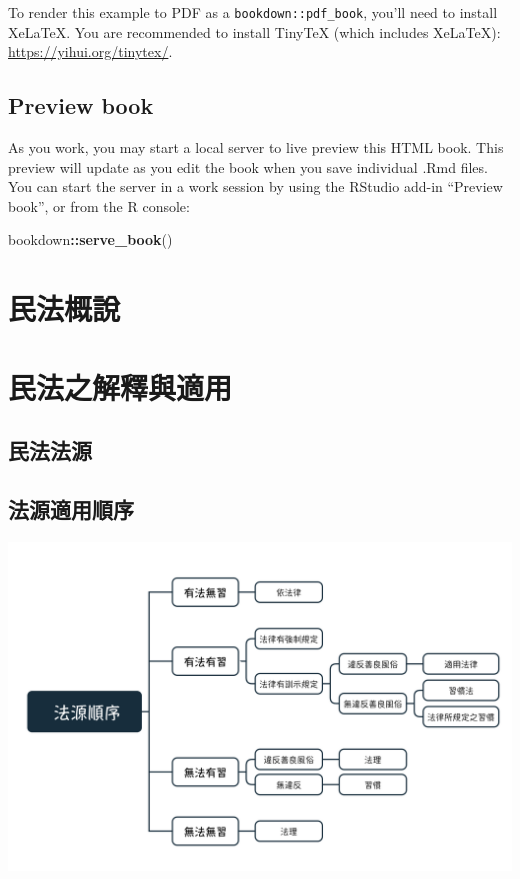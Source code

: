 \documentclass[
]{book}
\newenvironment{Shaded}{\begin{snugshade}}{\end{snugshade}}
\newcommand{\FunctionTok}[1]{\textcolor[rgb]{0.13,0.29,0.53}{\textbf{#1}}}
\newcommand{\NormalTok}[1]{#1}
\newcommand{\SpecialCharTok}[1]{\textcolor[rgb]{0.81,0.36,0.00}{\textbf{#1}}}
\begin{document}
To render this example to PDF as a \texttt{bookdown::pdf\_book}, you'll need to install XeLaTeX. You are recommended to install TinyTeX (which includes XeLaTeX): \url{https://yihui.org/tinytex/}.

\hypertarget{preview-book}{%
\section{Preview book}\label{preview-book}}

As you work, you may start a local server to live preview this HTML book. This preview will update as you edit the book when you save individual .Rmd files. You can start the server in a work session by using the RStudio add-in ``Preview book'', or from the R console:

\begin{Shaded}
\begin{Highlighting}[]
\NormalTok{bookdown}\SpecialCharTok{::}\FunctionTok{serve\_book}\NormalTok{()}
\end{Highlighting}
\end{Shaded}

\hypertarget{ux6c11ux6cd5ux6982ux8aaa}{%
\chapter{民法概說}\label{ux6c11ux6cd5ux6982ux8aaa}}

\hypertarget{ux6c11ux6cd5ux4e4bux89e3ux91cbux8207ux9069ux7528}{%
\chapter{民法之解釋與適用}\label{ux6c11ux6cd5ux4e4bux89e3ux91cbux8207ux9069ux7528}}

\hypertarget{ux6c11ux6cd5ux6cd5ux6e90}{%
\section*{民法法源}\label{ux6c11ux6cd5ux6cd5ux6e90}}

\hypertarget{ux6cd5ux6e90ux9069ux7528ux9806ux5e8f}{%
\section{法源適用順序}\label{ux6cd5ux6e90ux9069ux7528ux9806ux5e8f}}

\includegraphics[width=0.8\linewidth]{www/法源適用}
\end{document}
